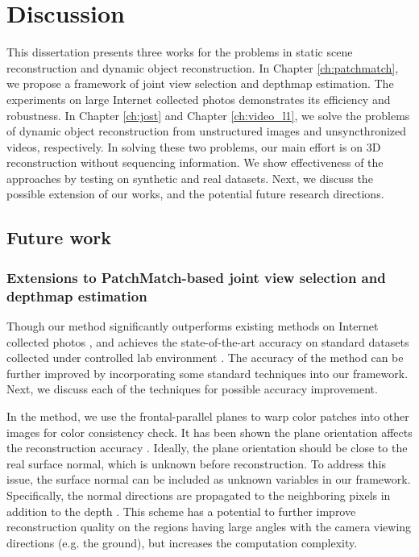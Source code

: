 \chapter{Discussion}
\label{ch:discussion}
This dissertation presents three works for the problems in static scene reconstruction and dynamic object reconstruction. In Chapter \ref{ch:patchmatch}, we propose a framework of joint view selection and depthmap estimation. The experiments on large Internet collected photos demonstrates its efficiency and robustness. In Chapter \ref{ch:jost} and Chapter \ref{ch:video_l1}, we solve the problems of dynamic object reconstruction from unstructured images and unsyncthronized videos, respectively. In solving these two problems, our main effort is on 3D reconstruction without sequencing information. We show effectiveness of the approaches by testing on synthetic and real datasets. Next, we discuss the possible extension of our works, and the potential future research directions.

\section{Future work}

\subsection{Extensions to PatchMatch-based joint view selection and depthmap estimation}
\label{sec:patchmatch_extensions}

Though our method significantly outperforms existing methods on Internet collected photos \cite{Goesele07}, and achieves the state-of-the-art accuracy on standard datasets collected under controlled lab environment \cite{Strecha08}. The accuracy of the method can be further improved by incorporating some standard techniques into our framework. Next, we discuss each of the techniques for possible accuracy improvement.

In the method, we use the frontal-parallel planes to warp color patches into other images for color consistency check. It has been shown the plane orientation affects the reconstruction accuracy \cite{Gallup07,FURUKAWA_PAMI2010}. Ideally, the plane orientation should be close to the real surface normal, which is unknown before reconstruction. To address this issue, the surface normal can be included as unknown variables in our framework. Specifically, the normal directions are propagated to the neighboring pixels in addition to the depth \cite{patchMatchStereo1}. This scheme has a potential to further improve reconstruction quality on the regions having large angles with the camera viewing directions (e.g. the ground), but increases the computation complexity.

